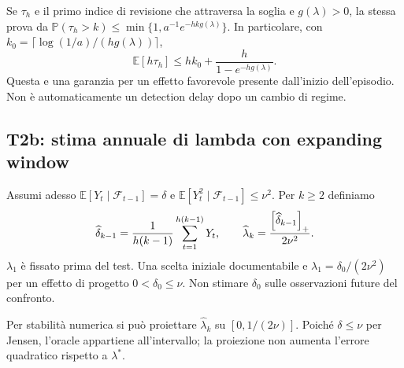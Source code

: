 \documentclass[11pt,a4paper]{article}
\theoremstyle{definition}\newtheorem{definition}[theorem]{Definizione}
\theoremstyle{remark}\newtheorem{remark}[theorem]{Osservazione}
\newcommand{\E}{\mathbb E}\newcommand{\PP}{\mathbb P}\newcommand{\R}{\mathbb R}
\newcommand{\F}{\mathcal F}\newcommand{\W}{\mathcal W}\newcommand{\supp}{\operatorname{supp}}
\begin{document}
Se $\tau_h$ e il primo indice di revisione che attraversa la soglia e $g(\lambda)>0$, la stessa prova da $\PP(\tau_h>k)\le\min\{1,a^{-1}e^{-hk g(\lambda)}\}$. In particolare, con $k_0=\lceil\log(1/a)/(h g(\lambda))\rceil$,
\begin{equation}
 \E[h\tau_h]\le hk_0+\frac{h}{1-e^{-h g(\lambda)}}.
\end{equation}
Questa e una garanzia per un effetto favorevole presente dall'inizio dell'episodio. Non è automaticamente un detection delay dopo un cambio di regime.

\subsection{T2b: stima annuale di lambda con expanding window}
Assumi adesso $\E[Y_t\mid\F_{t-1}]=\delta$ e $\E[Y_t^2\mid\F_{t-1}]\le\nu^2$. Per $k\ge2$ definiamo
\begin{equation}
 \widehat\delta_{k-1}=\frac1{h(k-1)}\sum_{t=1}^{h(k-1)}Y_t,
 \qquad \widehat\lambda_k=\frac{\left[\widehat\delta_{k-1}\right]_+}{2\nu^2}.\label{eq:lambda_hat}
\end{equation}
$\lambda_1$ è fissato prima del test. Una scelta iniziale documentabile e $\lambda_1=\delta_0/(2\nu^2)$ per un effetto di progetto $0<\delta_0\le\nu$. Non stimare $\delta_0$ sulle osservazioni future del confronto.

Per stabilità numerica si può proiettare $\widehat\lambda_k$ su $[0,1/(2\nu)]$. Poiché $\delta\le\nu$ per Jensen, l'oracle appartiene all'intervallo; la proiezione non aumenta l'errore quadratico rispetto a $\lambda^*$.
\end{document}
